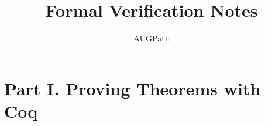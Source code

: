 \documentclass{book}
\begin{document}
\title{Formal Verification Notes}
\author{AUGPath}

\maketitle

\part{Part I. Proving Theorems with Coq}





\end{document}
